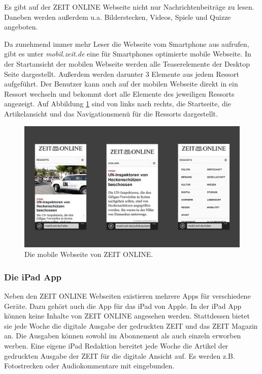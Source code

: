 \documentclass[12pt,a4paper,bibtotoc,abstracton]{scrartcl}
\begin{document}
Es gibt auf der ZEIT ONLINE Webseite nicht nur Nachrichtenbeiträge zu lesen. Daneben werden außerdem u.a. Bilderstecken, Videos, Spiele und Quizze angeboten. 

Da zunehmend immer mehr Leser die Webseite vom Smartphone aus aufrufen, gibt es unter \textit{mobil.zeit.de} eine für Smartphones optimierte mobile Webseite. In der Startansicht der mobilen Webseite werden alle Teaserelemente der Desktop Seite dargestellt. Außerdem werden darunter 3 Elemente aus jedem Ressort aufgeführt. Der Benutzer kann auch auf der mobilen Webseite direkt in ein Ressort wechseln und bekommt dort alle Elemente des jeweiligen Ressorts angezeigt. Auf Abbildung \ref{fig:mobilehomepage} sind von links nach rechts, die Startseite, die Artikelansicht und das Navigationsmenü für die Ressorts dargestellt.

\begin{figure}[h]	
	\centering
	\includegraphics[width=\textwidth]{Bilder/Screenshots/mobil.zeit.de/mobile.png} 
	\caption{Die mobile Webseite von ZEIT ONLINE.}
	\label{fig:mobilehomepage}
\end{figure}

\subsubsection{Die iPad App}
\label{subsubsec:ipadapp}
Neben den ZEIT ONLINE Webseiten existieren mehrere Apps für verschiedene Geräte. Dazu gehört auch die App für das iPad von Apple. In der iPad App können keine Inhalte von ZEIT ONLINE angesehen werden. Stattdessen bietet sie jede Woche die digitale Ausgabe der gedruckten ZEIT und das ZEIT Magazin an. Die Ausgaben können sowohl im Abonnement als auch einzeln erworben werben. Eine eigene iPad Redaktion bereitet jede Woche die Artikel der gedruckten Ausgabe der ZEIT für die digitale Ansicht auf. Es werden z.B. Fotostrecken oder Audiokommentare mit eingebunden.  
\end{document}
